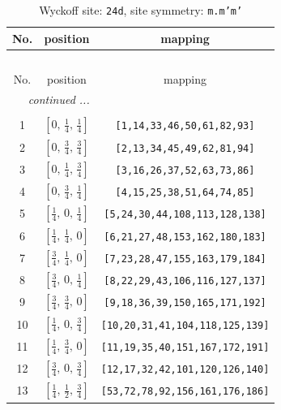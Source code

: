 \documentclass[fleqn,8pt]{jsarticle}
\begin{document}
\begin{longtable}{ccc}
\caption{Wyckoff site: {\tt 24d}, site symmetry: {\tt m.m'm'}}
 \\
 \hline \hline
No. & position & mapping \\ \hline \endfirsthead

\multicolumn{2}{l}{\tablename\ \thetable{}} \\
 \hline \hline
No. & position & mapping \\ \hline \endhead

 \hline \hline
\multicolumn{2}{r}{\footnotesize\it continued ...} \\ \endfoot

 \hline \hline
\multicolumn{2}{r}{} \\ \endlastfoot

1 & $\left[ 0,\, \frac{1}{4},\, \frac{1}{4} \right]$ & {\tt [1,14,33,46,50,61,82,93]} \\ \hline
2 & $\left[ 0,\, \frac{3}{4},\, \frac{3}{4} \right]$ & {\tt [2,13,34,45,49,62,81,94]} \\ \hline
3 & $\left[ 0,\, \frac{1}{4},\, \frac{3}{4} \right]$ & {\tt [3,16,26,37,52,63,73,86]} \\ \hline
4 & $\left[ 0,\, \frac{3}{4},\, \frac{1}{4} \right]$ & {\tt [4,15,25,38,51,64,74,85]} \\ \hline
5 & $\left[ \frac{1}{4},\, 0,\, \frac{1}{4} \right]$ & {\tt [5,24,30,44,108,113,128,138]} \\ \hline
6 & $\left[ \frac{1}{4},\, \frac{1}{4},\, 0 \right]$ & {\tt [6,21,27,48,153,162,180,183]} \\ \hline
7 & $\left[ \frac{3}{4},\, \frac{1}{4},\, 0 \right]$ & {\tt [7,23,28,47,155,163,179,184]} \\ \hline
8 & $\left[ \frac{3}{4},\, 0,\, \frac{1}{4} \right]$ & {\tt [8,22,29,43,106,116,127,137]} \\ \hline
9 & $\left[ \frac{3}{4},\, \frac{3}{4},\, 0 \right]$ & {\tt [9,18,36,39,150,165,171,192]} \\ \hline
10 & $\left[ \frac{1}{4},\, 0,\, \frac{3}{4} \right]$ & {\tt [10,20,31,41,104,118,125,139]} \\ \hline
11 & $\left[ \frac{1}{4},\, \frac{3}{4},\, 0 \right]$ & {\tt [11,19,35,40,151,167,172,191]} \\ \hline
12 & $\left[ \frac{3}{4},\, 0,\, \frac{3}{4} \right]$ & {\tt [12,17,32,42,101,120,126,140]} \\ \hline
13 & $\left[ \frac{1}{4},\, \frac{1}{2},\, \frac{3}{4} \right]$ & {\tt [53,72,78,92,156,161,176,186]} \\ \hline

\end{longtable}
\end{document}
